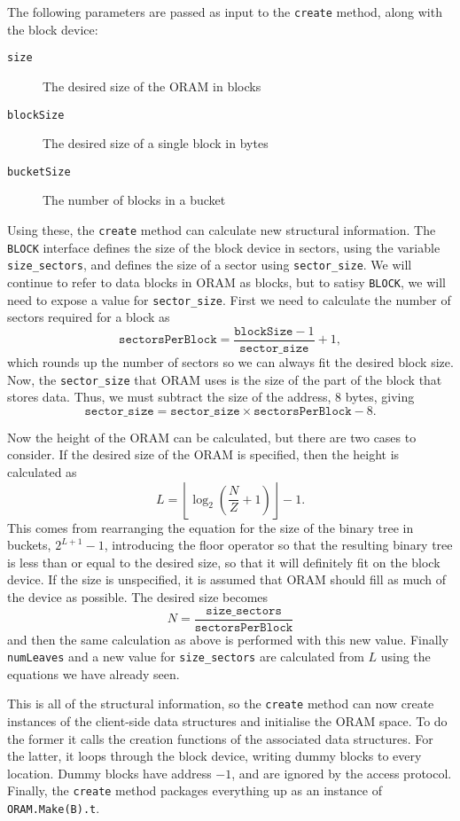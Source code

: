 \documentclass[12pt,a4paper,twoside,openright]{report}
\begin{document}
The following parameters are passed as input to the \texttt{create} method, along with the block device:

\begin{description}
  \item[\texttt{size}] The desired size of the ORAM in blocks
  \item[\texttt{blockSize}] The desired size of a single block in bytes
  \item[\texttt{bucketSize}] The number of blocks in a bucket
\end{description}

Using these, the \texttt{create} method can calculate new structural information. The \texttt{BLOCK} interface defines the size of the block device in sectors, using the variable \texttt{size\_sectors}, and defines the size of a sector using \texttt{sector\_size}. We will continue to refer to data blocks in ORAM as blocks, but to satisy \texttt{BLOCK}, we will need to expose a value for \texttt{sector\_size}. First we need to calculate the number of sectors required for a block as $$\mathtt{sectorsPerBlock} = \frac{\mathtt{blockSize} - 1}{\mathtt{sector\_size}} + 1,$$ which rounds up the number of sectors so we can always fit the desired block size. Now, the \texttt{sector\_size} that ORAM uses is the size of the part of the block that stores data. Thus, we must subtract the size of the address, 8 bytes, giving $$\mathtt{sector\_size} = \mathtt{sector\_size} \times \mathtt{sectorsPerBlock} - 8.$$

Now the height of the ORAM can be calculated, but there are two cases to consider. If the desired size of the ORAM is specified, then the height is calculated as $$L = \left\lfloor \log_2\left(\frac{N}{Z} + 1\right)\right\rfloor - 1.$$ This comes from rearranging the equation for the size of the binary tree in buckets, $2^{L + 1} - 1$, introducing the floor operator so that the resulting binary tree is less than or equal to the desired size, so that it will definitely fit on the block device. If the size is unspecified, it is assumed that ORAM should fill as much of the device as possible. The desired size becomes $$N = \frac{\mathtt{size\_sectors}}{\mathtt{sectorsPerBlock}}$$ and then the same calculation as above is performed with this new value. Finally \texttt{numLeaves} and a new value for \texttt{size\_sectors} are calculated from $L$ using the equations we have already seen.

This is all of the structural information, so the \texttt{create} method can now create instances of the client-side data structures and initialise the ORAM space. To do the former it calls the creation functions of the associated data structures. For the latter, it loops through the block device, writing dummy blocks to every location. Dummy blocks have address $-1$, and are ignored by the access protocol. Finally, the \texttt{create} method packages everything up as an instance of \texttt{ORAM.Make(B).t}.
\end{document}
